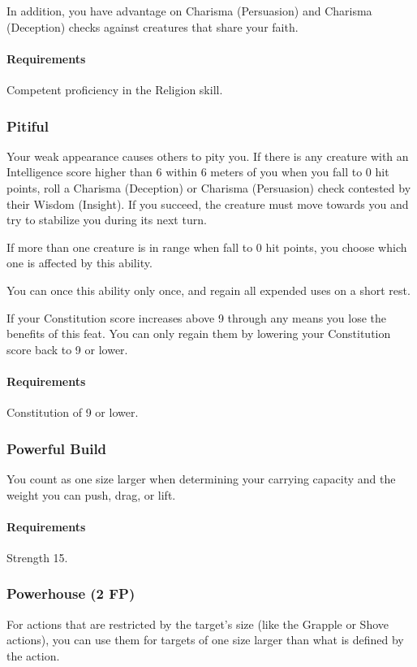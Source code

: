     In addition, you have advantage on Charisma (Persuasion) and Charisma (Deception) checks against creatures that share your faith.
    \paragraph{Requirements} Competent proficiency in the Religion skill.
\subsubsection{Pitiful} \label{feat::pitiful}
    Your weak appearance causes others to pity you.
    If there is any creature with an Intelligence score higher than 6 within 6 meters of you when you fall to 0 hit points, roll a Charisma (Deception) or Charisma (Persuasion) check contested by their Wisdom (Insight).
    If you succeed, the creature must move towards you and try to stabilize you during its next turn.

    If more than one creature is in range when fall to 0 hit points, you choose which one is affected by this ability.

    You can once this ability only once, and regain all expended uses on a short rest.

    If your Constitution score increases above 9 through any means you lose the benefits of this feat.
    You can only regain them by lowering your Constitution score back to 9 or lower.
    \paragraph{Requirements} Constitution of 9 or lower.
\subsubsection{Powerful Build} \label{feat::powerfulbuild_skill}
    You count as one size larger when determining your carrying capacity and the weight you can push, drag, or lift.
    \paragraph{Requirements} Strength 15.
\subsubsection{Powerhouse (2 FP)} \label{feat::powerhouse}
    For actions that are restricted by the target's size (like the Grapple or Shove actions), you can use them for targets of one size larger than what is defined by the action.
